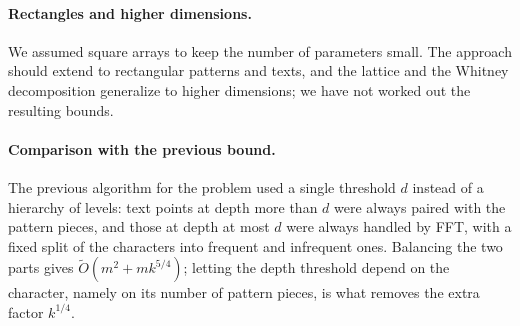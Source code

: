 \documentclass[11pt]{article}
\theoremstyle{definition}
\newcommand{\tO}{\tilde{O}}
\begin{document}
\paragraph{Rectangles and higher dimensions.}
We assumed square arrays to keep the number of parameters small.
The approach should extend to rectangular patterns and texts, and the lattice and the Whitney decomposition generalize to higher dimensions; we have not worked out the resulting bounds.

\paragraph{Comparison with the previous bound.}
The previous algorithm for the problem used a single threshold $d$ instead of a hierarchy of levels: text points at depth more than $d$ were always paired with the pattern pieces, and those at depth at most $d$ were always handled by FFT, with a fixed split of the characters into frequent and infrequent ones.
Balancing the two parts gives $\tO(m^2 + mk^{5/4})$; letting the depth threshold depend on the character, namely on its number of pattern pieces, is what removes the extra factor $k^{1/4}$.
\end{document}
